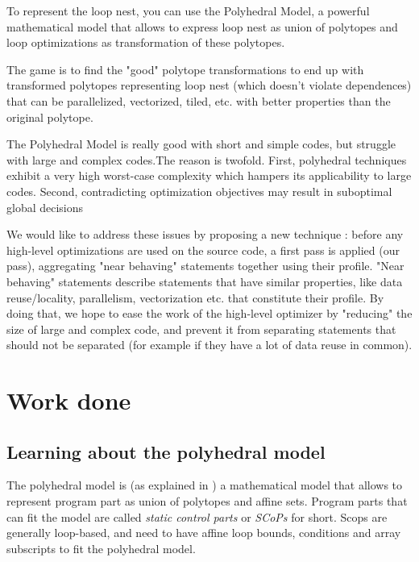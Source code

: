 \documentclass[paper=a4, fontsize=11pt]{scrartcl}
\numberwithin{equation}{section}        %
\numberwithin{figure}{section}          %
\numberwithin{table}{section}               %
\begin{document}
To represent the loop nest, you can use the Polyhedral Model, a powerful mathematical model
that allows to express loop nest as union of polytopes and loop optimizations as
transformation of these polytopes.

The game is to find the "good" polytope transformations to end up with
transformed polytopes representing loop nest (which doesn't violate dependences) 
that can be parallelized, vectorized, tiled, etc. with better properties than the original
polytope.

The Polyhedral Model is really good with short and simple codes, but struggle with
large and complex codes.The reason is twofold. First, polyhedral techniques exhibit
a very high worst-case complexity which hampers its applicability to large codes.
Second, contradicting optimization objectives may result in suboptimal global
decisions


We would like to address these issues by proposing a new technique : before any
high-level optimizations are used on the source code, a first pass is applied (our pass),
aggregating "near behaving" statements together using their profile.
"Near behaving" statements describe statements that have similar properties,
like data reuse/locality, parallelism, vectorization etc. that constitute their profile.
By doing that, we hope to ease the work of the high-level optimizer by "reducing" the size
of large and complex code, and prevent it from separating statements that should
not be separated (for example if they have a lot of data reuse in common).

\section{Work done}
    \subsection{Learning about the polyhedral model}
        The polyhedral model is (as explained in \cite{Bas'12}) a mathematical model that allows to represent program
        part as union of polytopes and affine sets. Program parts that can fit the model
        are called \textit{static control parts} or \textit{SCoPs} for short.
        Scops are generally loop-based, and need to have affine loop bounds, conditions and
        array subscripts to fit the polyhedral model.
\end{document}
